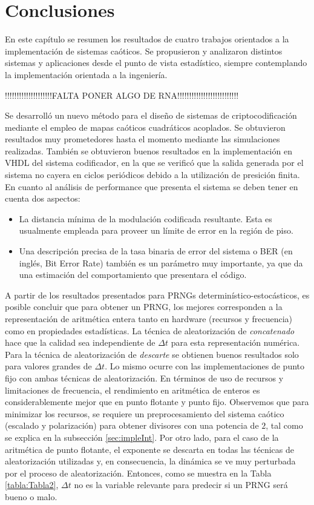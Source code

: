 \section{Conclusiones}

En este capítulo se resumen los resultados de cuatro trabajos orientados a la implementación de sistemas caóticos.
Se propusieron y analizaron distintos sistemas y aplicaciones desde el punto de vista estadístico, siempre contemplando la implementación orientada a la ingeniería.

!!!!!!!!!!!!!!!!!!!!FALTA PONER ALGO DE RNA!!!!!!!!!!!!!!!!!!!!!!!!!!

Se desarrolló un nuevo método para el diseño de sistemas de criptocodificación mediante el empleo de mapas caóticos cuadráticos acoplados.
Se obtuvieron resultados muy prometedores hasta el momento mediante las simulaciones realizadas.
También se obtuvieron buenos resultados en la implementación en VHDL del sistema codificador, en la que se verificó que la salida generada por el sistema no cayera en ciclos periódicos debido a la utilización de presición finita.
En cuanto al análisis de performance que presenta el sistema se deben tener en cuenta dos aspectos:
\begin{itemize}
	\item
	La distancia mínima de la modulación codificada resultante.
	Esta  es usualmente empleada para proveer un límite de error en la región de piso.
	\item
	Una descripción precisa de la tasa binaria de error del sistema o BER (en inglés, Bit Error Rate) también es un parámetro muy importante, ya que da una estimación del comportamiento que presentara el código.
\end{itemize}

A partir de los resultados presentados para PRNGs determinístico-estocásticos, es posible concluir que para obtener un PRNG, los mejores corresponden a la representación de aritmética entera tanto en hardware (recursos y frecuencia) como en propiedades estadísticas.
La técnica de aleatorización de \textit{concatenado} hace que la calidad sea independiente de $\Delta t$ para esta representación numérica.
Para la técnica de aleatorización de \textit{descarte} se obtienen buenos resultados solo para valores grandes de $\Delta t$.
Lo mismo ocurre con las implementaciones de punto fijo con ambas técnicas de aleatorización.
En términos de uso de recursos y limitaciones de frecuencia, el rendimiento en aritmética de enteros es considerablemente mejor que en punto flotante y punto fijo.
Observemos que para minimizar los recursos, se requiere un preprocesamiento del sistema caótico (escalado y polarización) para obtener divisores con una potencia de $2$, tal como se explica en la subsección \ref{sec:impleInt}.
Por otro lado, para el caso de la aritmética de punto flotante, el exponente se descarta en todas las técnicas de aleatorización utilizadas y, en consecuencia, la dinámica se ve muy perturbada por el proceso de aleatorización.
Entonces, como se muestra en la Tabla \ref{tabla:Tabla2}, $\Delta t $ no es la variable relevante para predecir si un PRNG será bueno o malo.

